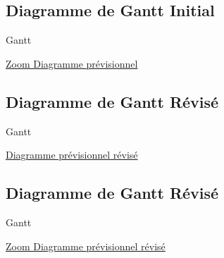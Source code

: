 \documentclass{beamer}
\begin{document}
	\subsection{Diagramme de Gantt Initial}
	\begin{frame}{Gantt}
	
		
		\begin{center}
			\href{run:Images/GantInitialClasses.gif}{Zoom Diagramme prévisionnel}
		\end{center}
	\end{frame}
	
	
	\subsection{Diagramme de Gantt R\'evis\'e}
	\begin{frame}{Gantt}
	
		
		\begin{center}
			\href{run:Images/Gantt_ProjetDiscretRéférence.gif}{Diagramme prévisionnel révisé}
		\end{center}
	\end{frame}


	\subsection{Diagramme de Gantt R\'evis\'e}
	\begin{frame}{Gantt}
	
		
		\begin{center}
			\href{run:Images/GantReferenceClasses.gif}{Zoom Diagramme prévisionnel révisé}
		\end{center}
	\end{frame}
	
\end{document}
